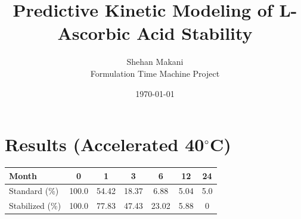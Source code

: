 \documentclass[11pt,a4paper]{article}
\title{Predictive Kinetic Modeling of L-Ascorbic Acid Stability}
\author{Shehan Makani \\ \small Formulation Time Machine Project}
\date{\today}
\begin{document}
\maketitle
\section{Results (Accelerated 40$^{\circ}$C)}
\begin{table}[h]
\centering
\begin{tabular}{lcccccc}
\toprule
Month & 0 & 1 & 3 & 6 & 12 & 24 \\ \midrule
Standard (\%) & 100.0 & 54.42 & 18.37 & 6.88 & 5.04 & 5.0 \\ 
Stabilized (\%) & 100.0 & 77.83 & 47.43 & 23.02 & 5.88 & 0 \\ \bottomrule
\end{tabular}
\end{table}
\end{document}
